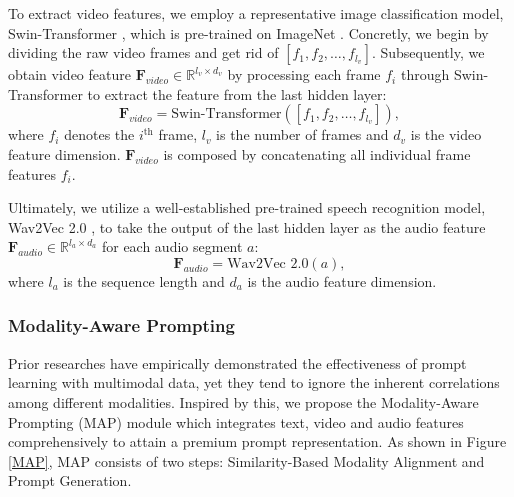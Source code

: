 \documentclass[letterpaper]{article} %
\begin{document}
To extract video features, we employ a representative image classification model, Swin-Transformer \cite{Liu_2021_ICCV}, which is pre-trained on ImageNet \cite{5206848}. Concretly, we begin by dividing the raw video frames and get rid of   $[f_{1}, f_{2}, \dots, f_{l_{v}}]$. Subsequently, we obtain video feature $\textbf{F}_{video} \in \mathbb{R}^{l_{v} \times d_{v}}$ by processing each frame $f_{i}$ through Swin-Transformer to extract the feature from the last hidden layer:
\begin{equation}
\textbf{F}_{video} = \text{Swin-Transformer}([f_{1}, f_{2}, \dots, f_{l_{v}}]),
\end{equation}
where $f_{i}$ denotes the $i^{\text{th}}$ frame, $l_{v}$ is the number of frames and $d_{v}$ is the video feature dimension. $\textbf{F}_{video}$ is composed by concatenating all individual frame features $f_{i}$.

Ultimately, we utilize a well-established pre-trained speech recognition model, Wav2Vec 2.0 \cite{NEURIPS2020_92d1e1eb}, to take the output of the last hidden layer as the audio feature $\textbf{F}_{audio} \in \mathbb{R}^{l_{a} \times d_{a}}$ for each audio segment $a$:
\begin{equation}
\textbf{F}_{audio} = \text{Wav2Vec 2.0}(a),
\end{equation}
where $l_{a}$ is the sequence length and $d_{a}$ is the audio feature dimension.


\subsubsection{Modality-Aware Prompting}

Prior researches \cite{zhou2022learning,zhou2022conditional,rao2022denseclip} have empirically demonstrated the effectiveness of prompt learning with multimodal data, yet they tend to ignore the inherent correlations among different modalities. Inspired by this, we propose the Modality-Aware Prompting (MAP) module which integrates text, video and audio features comprehensively to attain a premium prompt representation. As shown in Figure \ref{MAP}, MAP consists of two steps: Similarity-Based Modality Alignment and Prompt Generation.
\end{document}
